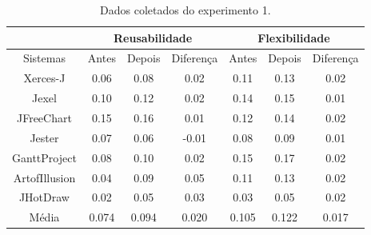 \begin{table}[h]
\centering
\caption{Dados coletados do experimento 1.}
\label{tab:dados_coletados_experimento_1}
\begin{tabular}{c|l|l|l|l|l|l|}
\cline{2-7}
\multicolumn{1}{l|}{}               & \multicolumn{3}{c|}{Reusabilidade}             & \multicolumn{3}{c|}{Flexibilidade} \\ \hline
\multicolumn{1}{|c|}{Sistemas}      & Antes         & Depois        & Diferença      & Antes     & Depois    & Diferença  \\ \hline
\multicolumn{1}{|c|}{Xerces-J}      & \multicolumn{1}{c|}{0.06}          & \multicolumn{1}{c|}{0.08}          & \multicolumn{1}{c|}{0.02} & \multicolumn{1}{c|}{0.11}      & \multicolumn{1}{c|}{0.13}      &\multicolumn{1}{c|}{0.02}\\ \hline
\multicolumn{1}{|c|}{Jexel}         & \multicolumn{1}{c|}{0.10}          & \multicolumn{1}{c|}{0.12}          & \multicolumn{1}{c|}{0.02} & \multicolumn{1}{c|}{0.14}      & \multicolumn{1}{c|}{0.15}      &\multicolumn{1}{c|}{0.01}\\ \hline
\multicolumn{1}{|c|}{JFreeChart}    & \multicolumn{1}{c|}{0.15}          & \multicolumn{1}{c|}{0.16}          & \multicolumn{1}{c|}{0.01} & \multicolumn{1}{c|}{0.12}      & \multicolumn{1}{c|}{0.14}      & \multicolumn{1}{c|}{0.02} \\ \hline
\multicolumn{1}{|c|}{Jester}        & \multicolumn{1}{c|}{0.07}          & \multicolumn{1}{c|}{0.06}          & \multicolumn{1}{c|}{-0.01} & \multicolumn{1}{c|}{0.08}      & \multicolumn{1}{c|}{0.09}      & \multicolumn{1}{c|}{0.01}  \\ \hline
\multicolumn{1}{|c|}{GanttProject}  & \multicolumn{1}{c|}{0.08}          & \multicolumn{1}{c|}{0.10}          & \multicolumn{1}{c|}{0.02} & \multicolumn{1}{c|}{0.15}      & \multicolumn{1}{c|}{0.17}      &  \multicolumn{1}{c|}{0.02} \\ \hline
\multicolumn{1}{|c|}{ArtofIllusion} & \multicolumn{1}{c|}{0.04}          & \multicolumn{1}{c|}{0.09}          & \multicolumn{1}{c|}{0.05} & \multicolumn{1}{c|}{0.11}      & \multicolumn{1}{c|}{0.13}      & \multicolumn{1}{c|}{0.02} \\ \hline
\multicolumn{1}{|c|}{JHotDraw}      & \multicolumn{1}{c|}{0.02}          & \multicolumn{1}{c|}{0.05}          & \multicolumn{1}{c|}{0.03} & \multicolumn{1}{c|}{0.03}      & \multicolumn{1}{c|}{0.05}      & \multicolumn{1}{c|}{0.02}\\ \hline
\multicolumn{1}{|c|}{Média}         & \multicolumn{1}{c|}{0.074}         & \multicolumn{1}{c|}{0.094}         & \multicolumn{1}{c|}{0.020} & \multicolumn{1}{c|}{0.105}     & \multicolumn{1}{c|}{0.122}     & \multicolumn{1}{c|}{0.017} \\ \hline

\end{tabular}
\end{table}
